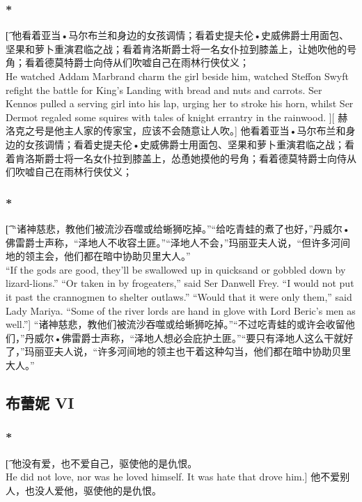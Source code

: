 \documentclass[12pt,a4paper]{article}
\begin{document}
\subsubsection{\color{red}*}\t[
	他看着亚当•马尔布兰和身边的女孩调情；看着史提夫伦•史威佛爵士用面包、坚果和萝卜重演君临之战；看着肯洛斯爵士将一名女仆拉到膝盖上，让她吹他的号角；看着德莫特爵士向侍从们吹嘘自己在雨林行侠仗义；\\
	He watched Addam Marbrand charm the girl beside him, watched Steffon Swyft refight the battle for King's Landing with bread and nuts and carrots. Ser Kennos pulled a serving girl into his lap, urging her to stroke his horn, whilst Ser Dermot regaled some squires with tales of knight errantry in the rainwood. ][
	赫洛克之号是他主人家的传家宝，应该不会随意让人吹。]
	他看着亚当•马尔布兰和身边的女孩调情；看着史提夫伦•史威佛爵士用面包、坚果和萝卜重演君临之战；看着肯洛斯爵士将一名女仆拉到膝盖上，怂恿她摸他的号角；看着德莫特爵士向侍从们吹嘘自己在雨林行侠仗义；

\subsubsection{\color{red}*}\t[	
	“诸神慈悲，教他们被流沙吞噬或给蜥狮吃掉。”“给吃青蛙的煮了也好，”丹威尔•佛雷爵士声称，“泽地人不收容土匪。”“泽地人不会，”玛丽亚夫人说，“但许多河间地的领主会，他们都在暗中协助贝里大人。”\\
	“If the gods are good, they'll be swallowed up in quicksand or gobbled down by lizard-lions.” “Or taken in by frogeaters,” said Ser Danwell Frey. “I would not put it past the crannogmen to shelter outlaws.” “Would that it were only them,” said Lady Mariya. “Some of the river lords are hand in glove with Lord Beric's men as well.”]
	“诸神慈悲，教他们被流沙吞噬或给蜥狮吃掉。”“不过吃青蛙的或许会收留他们，”丹威尔•佛雷爵士声称，“泽地人想必会庇护土匪。”“要只有泽地人这么干就好了，”玛丽亚夫人说，“许多河间地的领主也干着这种勾当，他们都在暗中协助贝里大人。”
	
\subsection{布蕾妮 VI}
\subsubsection{\color{red}*}\t[
	他没有爱，也不爱自己，驱使他的是仇恨。\\
	He did not love, nor was he loved himself. It was hate that drove him.]
	他不爱别人，也没人爱他，驱使他的是仇恨。
	
\end{document}
